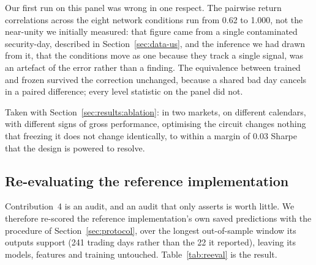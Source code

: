 Our first run on this panel was wrong in one respect.
The pairwise return correlations across the eight network conditions run from
\num{0.62} to \num{1.000}, not the near-unity we initially measured: that
figure came from a single contaminated security-day, described in
Section~\ref{sec:data-us}, and the inference we had drawn from it, that the
conditions move as one because they track a single signal, was an artefact
of the error rather than a finding. The equivalence between trained and frozen
survived the correction unchanged, because a shared bad day cancels in a paired
difference; every level statistic on the panel did not.

Taken with Section~\ref{sec:results:ablation}: in two markets, on different
calendars, with different signs of gross performance, optimising the circuit
changes nothing that freezing it does not change identically, to within a
margin of \num{0.03} Sharpe that the design is powered to resolve.

\subsection{Re-evaluating the reference implementation}
\label{sec:results:reeval}

Contribution~4 is an audit, and an audit that only asserts is worth little. We
therefore re-scored the reference implementation's own saved predictions with
the procedure of Section~\ref{sec:protocol}, over the longest out-of-sample
window its outputs support (\num{241} trading days rather than the \num{22}
it reported), leaving its models, features and training untouched.
Table~\ref{tab:reeval} is the result.

